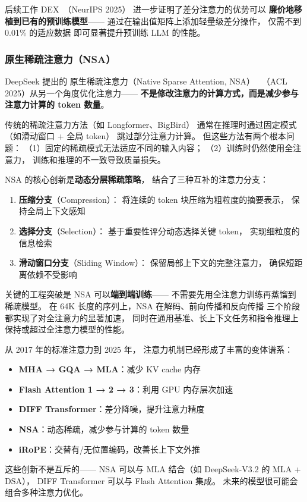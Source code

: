后续工作 DEX~\cite{kong2025dex}（NeurIPS 2025）
进一步证明了差分注意力的优势可以
\textbf{廉价地移植到已有的预训练模型}——
通过在输出值矩阵上添加轻量级差分操作，
仅需不到 0.01\% 的适应数据
即可显著提升预训练 LLM 的性能。

\subsubsection{原生稀疏注意力（NSA）}

DeepSeek 提出的
原生稀疏注意力（Native Sparse Attention, NSA）~\cite{yuan2025nsa}
（ACL 2025）从另一个角度优化注意力——
\textbf{不是修改注意力的计算方式，而是减少参与注意力计算的 token 数量}。

传统的稀疏注意力方法（如 Longformer、BigBird）
通常在推理时通过固定模式（如滑动窗口 + 全局 token）
跳过部分注意力计算。
但这些方法有两个根本问题：
（1）固定的稀疏模式无法适应不同的输入内容；
（2）训练时仍然使用全注意力，
训练和推理的不一致导致质量损失。

NSA 的核心创新是\textbf{动态分层稀疏策略}，
结合了三种互补的注意力分支：
\begin{enumerate}[noitemsep]
  \item \textbf{压缩分支}（Compression）：
        将连续的 token 块压缩为粗粒度的摘要表示，
        保持全局上下文感知
  \item \textbf{选择分支}（Selection）：
        基于重要性评分动态选择关键 token，
        实现细粒度的信息检索
  \item \textbf{滑动窗口分支}（Sliding Window）：
        保留局部上下文的完整注意力，
        确保短距离依赖不受影响
\end{enumerate}

关键的工程突破是 NSA 可以\textbf{端到端训练}——
不需要先用全注意力训练再蒸馏到稀疏模型。
在 64K 长度的序列上，NSA 在解码、前向传播和反向传播
三个阶段都实现了对全注意力的显著加速，
同时在通用基准、长上下文任务和指令推理上
保持或超过全注意力模型的性能。

\begin{corebox}[注意力机制的演化谱系]
从 2017 年的标准注意力到 2025 年，
注意力机制已经形成了丰富的变体谱系：
\begin{itemize}[noitemsep]
  \item \textbf{MHA → GQA → MLA}：减少 KV cache 内存
  \item \textbf{Flash Attention 1 → 2 → 3}：利用 GPU 内存层次加速
  \item \textbf{DIFF Transformer}：差分降噪，提升注意力精度
  \item \textbf{NSA}：动态稀疏，减少参与计算的 token 数量
  \item \textbf{iRoPE}：交替有/无位置编码，改善长上下文外推
\end{itemize}
这些创新不是互斥的——
NSA 可以与 MLA 结合（如 DeepSeek-V3.2 的 MLA + DSA），
DIFF Transformer 可以与 Flash Attention 集成。
未来的模型很可能会组合多种注意力优化。
\end{corebox}

